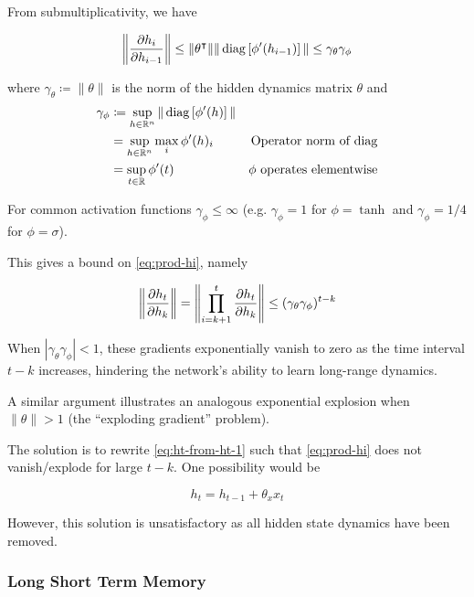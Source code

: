 From submultiplicativity, we have

\begin{equation}
    \left\| \frac{\partial h_i}{\partial h_{i-1}} \right\|
    \leq \|\theta^\intercal\| \| \operatorname*{diag}\left[ \phi'(h_{i-1}) \right] \|
    \leq \gamma_{\theta} \gamma_\phi
\end{equation}

where $\gamma_\theta \coloneqq \|\theta\|$ is the norm of the hidden dynamics matrix $\theta$
and
\begin{align}
    \gamma_\phi
    &\coloneqq \sup_{h \in \mathbb{R}^n} \| \operatorname*{diag} \left[ \phi'(h) \right] \|  &\\
    &= \sup_{h \in \mathbb{R}^n} \max_i \phi'(h)_i &\mbox{Operator norm of diag} \\
    &= \sup_{t \in \mathbb{R}} \phi'(t) &\mbox{$\phi$ operates elementwise}
\end{align}

For common activation functions $\gamma_{\phi} \leq \infty$ (e.g. $\gamma_\phi = 1$ for $\phi = \tanh$
and $\gamma_\phi = 1/4$ for $\phi = \sigma$).

This gives a bound on \autoref{eq:prod-hi}, namely

\begin{equation}
    \left\| \frac{\partial h_t}{\partial h_k} \right\|
    = \left\| \prod_{i=k+1}^{t} \frac{\partial h_t}{\partial h_k} \right\|
    \leq (\gamma_\theta \gamma_\phi)^{t-k}
\end{equation}

When $|\gamma_\theta \gamma_\phi| < 1$, these gradients exponentially vanish to zero as
the time interval $t - k$ increases, hindering the network's ability to learn long-range
dynamics.

A similar argument \cite{Bengio1994} illustrates an analogous exponential explosion
when $\|\theta\| > 1$ (the ``exploding gradient'' problem).

The solution is to rewrite \autoref{eq:ht-from-ht-1} such that
\autoref{eq:prod-hi} does not vanish/explode for large $t - k$.
One possibility would be

\begin{equation}
    h_t = h_{t-1} + \theta_x x_t
\end{equation}

However, this solution is unsatisfactory as all hidden state dynamics have been
removed.

\subsubsection{Long Short Term Memory}

